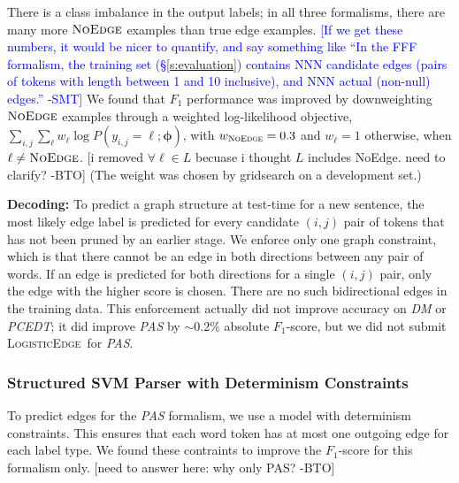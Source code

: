\documentclass[11pt]{article}
\newcommand{\bocomment}[1]{\textcolor{Bittersweet}{[#1 -BTO]}}
\newcommand{\sam}[1]{\textcolor{blue}{[#1 -SMT]}}
\newcommand{\codenote}[1]{}
\newcommand{\logitedge}{\textsc{LogisticEdge}}
\newcommand{\noedge}{\textsc{NoEdge}}
\begin{document}
There is a class imbalance in the output labels; in all three formalisms, there
are many more $\noedge$ examples than true edge examples.
\sam{If we get these numbers, it would be nicer to quantify, and say something
like ``In the FFF formalism, the training set (\S\ref{s:evaluation}) contains NNN
candidate edges (pairs of tokens with length between 1 and 10 inclusive), and NNN actual (non-null) edges.''}
We found that $F_1$ performance was improved by
downweighting $\noedge$ examples through a weighted log-likelihood objective,
$\sum_{i,j} \sum_\ell w_\ell \log P(y_{i,j}=\ell; \bm\phi)$, with $w_{\noedge}=0.3$
and $w_{\ell} = 1$ otherwise, when $\ell \neq \noedge$.
\bocomment{i removed $\forall \ell \in L$ becuase i thought $L$ includes NoEdge. need to clarify?}
(The weight was chosen by gridsearch on a development set.)




\textbf{Decoding:} \codenote{MyGraph::decodeEdgeProbsToGraph()}
To predict a graph structure at test-time for a new sentence,
the most likely edge label is predicted for every candidate $(i, j)$ pair of
tokens that has not been pruned by an earlier stage.
We enforce only one graph constraint, which is that there cannot be
an edge in both directions between any pair of words.
If an edge is predicted for both directions for a single $(i, j)$
pair, only the edge with the higher score is chosen.
There are no such bidirectional edges in the training data.
This enforcement actually did not improve accuracy on \emph{DM} or \emph{PCEDT};
it did improve \emph{PAS} by $\sim 0.2\%$ absolute $F_1$-score, but we did not submit \logitedge\ for \emph{PAS}.
\codenote{\url{https://github.com/Noahs-ARK/semeval-2014/pull/21}}


\subsubsection{Structured SVM Parser with Determinism Constraints} \label{s:graphparser}


To predict edges for the \emph{PAS} formalism, we use a model with determinism
constraints.  This ensures that each word token has at most one
outgoing edge for each label type.  We found these contraints to improve the $F_1$-score
for this formalism only.
\bocomment{need to answer here: why only PAS?}
\end{document}
